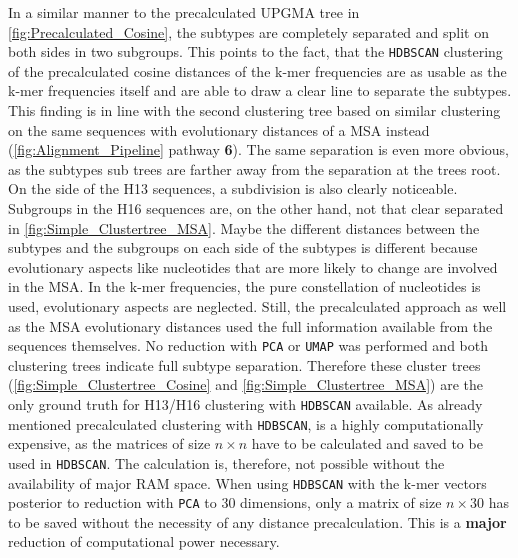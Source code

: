 In a similar manner to the precalculated \gls{UPGMA} tree in \autoref{fig:Precalculated_Cosine}, the subtypes are completely separated and split on both sides in two subgroups. This points to the fact, that the \texttt{HDBSCAN} clustering of the precalculated cosine distances of the k-mer frequencies are as usable as the k-mer frequencies itself and are able to draw a clear line to separate the subtypes. This finding is in line with the second clustering tree based on similar clustering on the same sequences with evolutionary distances of a \gls{MSA} instead (\autoref{fig:Alignment_Pipeline} pathway \textsf{\textbf{6}}). The same separation is even more obvious, as the subtypes sub trees are farther away from the separation at the trees root. On the side of the H13 sequences, a subdivision is also clearly noticeable. Subgroups in the H16 sequences are, on the other hand, not that clear separated in \autoref{fig:Simple_Clustertree_MSA}. Maybe the different distances between the subtypes and the subgroups on each side of the subtypes is different because evolutionary aspects like nucleotides that are more likely to change are involved in the \gls{MSA}. In the k-mer frequencies, the pure constellation of nucleotides is used, evolutionary aspects are neglected. Still, the precalculated approach as well as the \gls{MSA} evolutionary distances used the full information available from the sequences themselves. No reduction with \texttt{PCA} or \texttt{UMAP} was performed and both clustering trees indicate full subtype separation. Therefore these cluster trees (\autoref{fig:Simple_Clustertree_Cosine} and \autoref{fig:Simple_Clustertree_MSA}) are the only ground truth for H13/H16 clustering with \texttt{HDBSCAN} available. As already mentioned precalculated clustering with \texttt{HDBSCAN}, is a highly computationally expensive, as the matrices of size $n \times n$ have to be calculated and saved to be used in \texttt{HDBSCAN}. The calculation is, therefore, not possible without the availability of major RAM space. When using \texttt{HDBSCAN} with the k-mer vectors posterior to reduction with \texttt{PCA} to 30 dimensions, only a matrix of size $n\times 30$ has to be saved without the necessity of any distance precalculation. This is a \textbf{major} reduction of computational power necessary. 

\vspace{1em}

